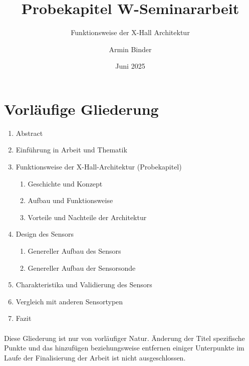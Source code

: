 \documentclass[12pt, a4paper]{article}
\title{Probekapitel W-Seminararbeit}
\subtitle{Funktionsweise der X-Hall Architektur}
\author{Armin Binder }
\date{Juni 2025}
\begin{document}
	\pagestyle{fancy}
	\fancyhf{} 
	\fancyfoot[C]{\thepage}
	
	\maketitle
	\thispagestyle{empty}
	\pagebreak
	
	\tableofcontents
	\thispagestyle{empty}
	\pagebreak
	{
	\section{Vorläufige Gliederung}
	\begin{enumerate}
		\item Abstract
		\item Einführung in Arbeit und Thematik
		\item Funktionsweise der X-Hall-Architektur (Probekapitel)
		\begin{enumerate}
			\item Geschichte und Konzept
			\item Aufbau und Funktionsweise
			\item Vorteile und Nachteile der Architektur
		\end{enumerate}
		\item Design des Sensors
		\begin{enumerate}
			\item Genereller Aufbau des Sensors
			\item Genereller Aufbau der Sensorsonde
		\end{enumerate}
		\item Charakteristika und Validierung des Sensors
		\item Vergleich mit anderen Sensortypen
		\item Fazit
	\end{enumerate}\paragraph{}
	\centering
	Diese Gliederung ist nur von vorläufiger Natur. Änderung der Titel spezifische Punkte und das hinzufügen beziehungsweise entfernen einiger Unterpunkte im Laufe der Finalisierung der Arbeit ist nicht ausgeschlossen.
	\newpage}
	
\end{document}
